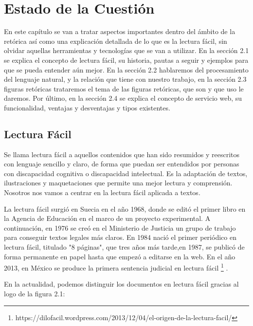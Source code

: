 \chapter{Estado de la Cuestión}
\label{cap:estadoDeLaCuestion}


	En este capítulo se van a tratar aspectos importantes dentro del ámbito de la retórica así como una explicación detallada de lo que es la lectura fácil, sin olvidar aquellas herramientas y tecnologías que se van a utilizar.
	En la sección 2.1 se explica el concepto de lectura fácil, su historia, pautas a seguir y ejemplos para que se pueda entender aún mejor. 
	En la sección 2.2 hablaremos del procesamiento del lenguaje natural, y la relación que tiene con nuestro trabajo, en la sección 2.3 figuras retóricas trataremos el tema de las figuras retóricas, que son y que uso le daremos. Por último, en la sección 2.4 se explica el concepto de servicio web, su funcionalidad, ventajas y desventajas y tipos existentes.
	



\section{Lectura Fácil}
\label{cap:sec:lecturafacil}
Se llama lectura fácil a aquellos contenidos que han sido resumidos y reescritos con lenguaje sencillo y claro, de forma que puedan ser entendidos por personas con discapacidad cognitiva o discapacidad intelectual. Es la adaptación de textos, ilustraciones y maquetaciones que permite una mejor lectura y comprensión.
Nosotros nos vamos a centrar en la lectura fácil aplicada a textos.

La lectura fácil surgió en Suecia en el año 1968, donde se editó el primer libro en la Agencia de Educación en el marco de un proyecto experimental. A continuación, en 1976 se creó en el Ministerio de Justicia un grupo de trabajo para conseguir textos legales más claros.
En 1984 nació el primer periódico en lectura fácil, titulado "8 páginas", que tres años más tarde,en 1987, se publicó de forma permanente en papel hasta que empezó a editarse en la web. 
En el año 2013, en México se produce la primera sentencia judicial en lectura fácil \footnote{https://dilofacil.wordpress.com/2013/12/04/el-origen-de-la-lectura-facil/}
.

En la actualidad, podemos distinguir los documentos en lectura fácil gracias al logo de la figura 2.1:
	
